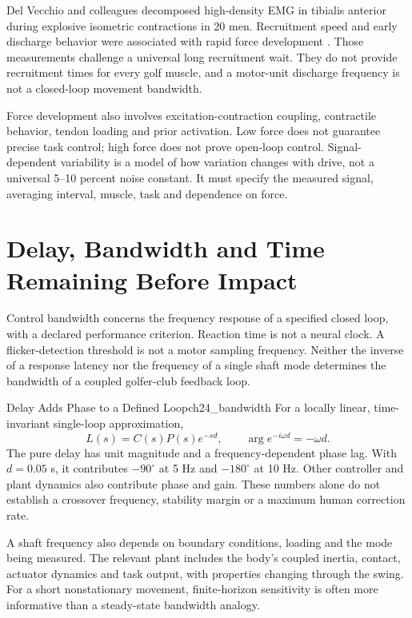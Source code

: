 Del Vecchio and colleagues decomposed high-density EMG in tibialis anterior during explosive isometric contractions in 20 men. Recruitment speed and early discharge behavior were associated with rapid force development \citep{DelVecchio2019Recruitment}. Those measurements challenge a universal long recruitment wait. They do not provide recruitment times for every golf muscle, and a motor-unit discharge frequency is not a closed-loop movement bandwidth.

Force development also involves excitation-contraction coupling, contractile behavior, tendon loading and prior activation. Low force does not guarantee precise task control; high force does not prove open-loop control. Signal-dependent variability is a model of how variation changes with drive, not a universal 5--10 percent noise constant. It must specify the measured signal, averaging interval, muscle, task and dependence on force.

\section{Delay, Bandwidth and Time Remaining Before Impact}
\label{sec:ch24_bandwidth}
\label{constr:box:ch24_bandwidth_problem}
Control bandwidth concerns the frequency response of a specified closed loop, with a declared performance criterion. Reaction time is not a neural clock. A flicker-detection threshold is not a motor sampling frequency. Neither the inverse of a response latency nor the frequency of a single shaft mode determines the bandwidth of a coupled golfer-club feedback loop.

\begin{definition}{Delay Adds Phase to a Defined Loop}{ch24_bandwidth}
For a locally linear, time-invariant single-loop approximation,
\[
L(s)=C(s)P(s)e^{-sd},\qquad
\arg e^{-i\omega d}=-\omega d.
\]
The pure delay has unit magnitude and a frequency-dependent phase lag. With $d=0.05$ s, it contributes $-90^\circ$ at 5 Hz and $-180^\circ$ at 10 Hz. Other controller and plant dynamics also contribute phase and gain. These numbers alone do not establish a crossover frequency, stability margin or a maximum human correction rate.
\end{definition}

A shaft frequency also depends on boundary conditions, loading and the mode being measured. The relevant plant includes the body's coupled inertia, contact, actuator dynamics and task output, with properties changing through the swing. For a short nonstationary movement, finite-horizon sensitivity is often more informative than a steady-state bandwidth analogy.

